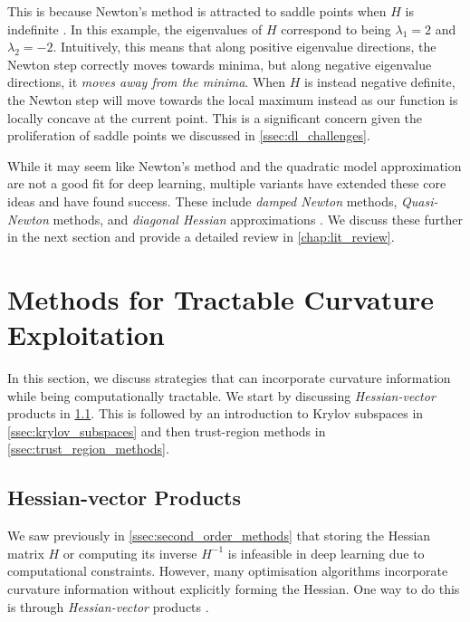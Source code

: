 This is because Newton's method is attracted to saddle points when $H$ is indefinite \citep{dauphin2014sfn}. In this example, the eigenvalues of $H$ correspond to being $\lambda_1 = 2$ and $\lambda_2 = -2$. Intuitively, this means that along positive eigenvalue directions, the Newton step correctly moves towards minima, but along negative eigenvalue directions, it \textit{moves away from the minima}. When $H$ is instead negative definite, the Newton step will move towards the local maximum instead as our function is locally concave at the current point. This is a significant concern given the proliferation of saddle points we discussed in \cref{ssec:dl_challenges}. 

While it may seem like Newton's method and the quadratic model approximation are not a good fit for deep learning, multiple variants have extended these core ideas and have found success. These include \textit{damped Newton} methods, \textit{Quasi-Newton} methods, and \textit{diagonal Hessian} approximations \citep{NoceWrig06, liu2023sophia}. We discuss these further in the next section and provide a detailed review in \cref{chap:lit_review}.

\section{Methods for Tractable Curvature Exploitation}
\label{sec:tractable_curvature_exploitation}

In this section, we discuss strategies that can incorporate curvature information while being computationally tractable. We start by discussing \textit{Hessian-vector} products in \cref{ssec:hessian_vector_products}. This is followed by an introduction to Krylov subspaces in \cref{ssec:krylov_subspaces} and then trust-region methods in \cref{ssec:trust_region_methods}.

\subsection{Hessian-vector Products}
\label{ssec:hessian_vector_products}

We saw previously in \cref{ssec:second_order_methods} that storing the Hessian matrix $H$ or computing its inverse $H^{-1}$ is infeasible in deep learning due to computational constraints. However, many optimisation algorithms incorporate curvature information without explicitly forming the Hessian. One way to do this is through \textit{Hessian-vector} products \citep{pearlmutter1994fast,bloghvp}.

